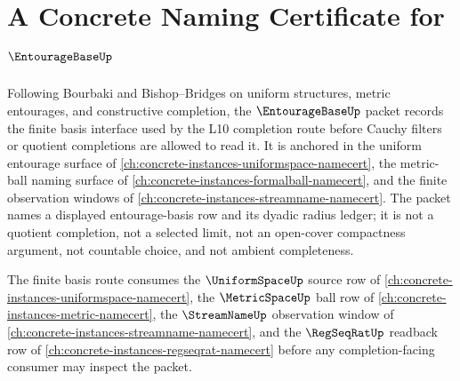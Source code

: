 \chapter{A Concrete Naming Certificate for $\EntourageBaseUp$}
\label{ch:concrete-instances-entourage-base-namecert}

Following Bourbaki and Bishop--Bridges on uniform structures, metric entourages, and constructive completion, the $\EntourageBaseUp$ packet records the finite basis interface used by the L10 completion route before Cauchy filters or quotient completions are allowed to read it. It is anchored in the uniform entourage surface of \autoref{ch:concrete-instances-uniformspace-namecert}, the metric-ball naming surface of \autoref{ch:concrete-instances-formalball-namecert}, and the finite observation windows of \autoref{ch:concrete-instances-streamname-namecert}. The packet names a displayed entourage-basis row and its dyadic radius ledger; it is not a quotient completion, not a selected limit, not an open-cover compactness argument, not countable choice, and not ambient completeness.

The finite basis route consumes the $\UniformSpaceUp$ source row of \autoref{ch:concrete-instances-uniformspace-namecert}, the $\MetricSpaceUp$ ball row of \autoref{ch:concrete-instances-metric-namecert}, the $\StreamNameUp$ observation window of \autoref{ch:concrete-instances-streamname-namecert}, and the $\RegSeqRatUp$ readback row of \autoref{ch:concrete-instances-regseqrat-namecert} before any completion-facing consumer may inspect the packet.

